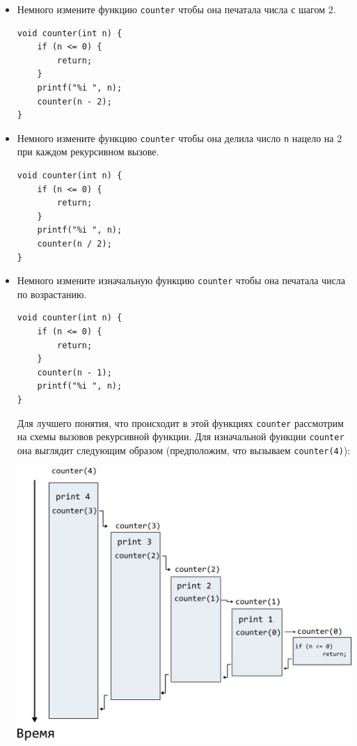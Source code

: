 \documentclass{article}
\begin{document}
\begin{itemize}
\item Немного измените функцию \texttt{counter} чтобы она печатала числа с шагом 2.

\begin{lstlisting}[backgroundcolor = \color{solcolor}]
void counter(int n) {
    if (n <= 0) {
        return;
    }
    printf("%i ", n);
    counter(n - 2);
}
\end{lstlisting}

\item Немного измените функцию \texttt{counter} чтобы она делила число \texttt{n} нацело на 2 при каждом рекурсивном вызове.

\begin{lstlisting}[backgroundcolor = \color{solcolor}]
void counter(int n) {
    if (n <= 0) {
        return;
    }
    printf("%i ", n);
    counter(n / 2);
}
\end{lstlisting}

\item Немного измените изначальную функцию \texttt{counter} чтобы она печатала числа по возрастанию. 
\begin{lstlisting}[backgroundcolor = \color{solcolor}]
void counter(int n) {
    if (n <= 0) {
        return;
    }
    counter(n - 1);
    printf("%i ", n);
}
\end{lstlisting}
Для лучшего понятия, что происходит в этой функциях \texttt{counter} рассмотрим на схемы вызовов рекурсивной функции. Для изначальной функции \texttt{counter} она выглядит следующим образом (предположим, что вызываем \texttt{counter(4)}):


\begin{center}
\includegraphics[scale=0.67]{../images/counterini.png}
\end{center}


\end{itemize}
\end{document}
